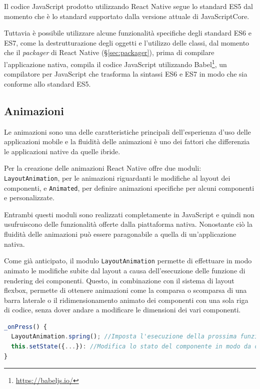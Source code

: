 Il codice JavaScript prodotto utilizzando React Native segue lo standard ES5 dal momento che è lo standard supportato dalla versione attuale di JavaScriptCore.

Tuttavia è possibile utilizzare alcune funzionalità specifiche degli standard ES6 e ES7, come la destrutturazione degli oggetti e l'utilizzo delle classi, dal momento che il \textit{packager} di React Native (§\ref{sec:packager}), prima di compilare l'applicazione nativa, compila il codice JavaScript utilizzando Babel\footnote{\url{https://babeljs.io/}}, un compilatore per JavaScript che trasforma la sintassi ES6 e ES7 in modo che sia conforme allo standard ES5.

\subsection{Animazioni}
Le animazioni sono una delle caratteristiche principali dell'esperienza d'uso delle applicazioni mobile e la fluidità delle animazioni è uno dei fattori che differenzia le applicazioni native da quelle ibride.

Per la creazione delle animazioni React Native offre due moduli: \texttt{LayoutAnimation}, per le animazioni riguardanti le modifiche al layout dei componenti, e \texttt{Animated}, per definire animazioni specifiche per alcuni componenti e personalizzate.

Entrambi questi moduli sono realizzati completamente in JavaScript e quindi non usufruiscono delle funzionalità offerte dalla piattaforma nativa. Nonostante ciò la fluidità delle animazioni può essere paragonabile a quella di un'applicazione nativa.

Come già anticipato, il modulo \texttt{LayoutAnimation} permette di effettuare in modo animato le modifiche subite dal layout a causa dell'esecuzione delle funzione di rendering dei componenti.
Questo, in combinazione con il sistema di layout flexbox, permette di ottenere animazioni come la comparsa o scomparsa di una barra laterale o il ridimensionamento animato dei componenti con una sola riga di codice, senza dover andare a modificare le dimensioni dei vari componenti.

\begin{lstlisting}[language=JavaScript, caption=Utilizzo di LayoutAnimation]
_onPress() {
  LayoutAnimation.spring(); //Imposta l'esecuzione della prossima funzione di rendering in modo animato
  this.setState({...}): //Modifica lo stato del componente in modo da causarne il re-rendering
}
\end{lstlisting}


